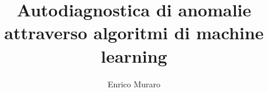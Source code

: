 \title{Autodiagnostica di anomalie attraverso algoritmi di machine learning}
\author{Enrico Muraro}



